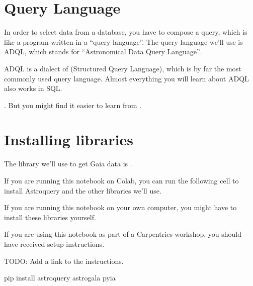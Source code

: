 \documentclass[letterpaper,10pt,english]{sphinxmanual}
\begin{document}
\section{Query Language}
\label{\detokenize{01_query:query-language}}
In order to select data from a database, you have to compose a query, which is like a program written in a “query language”.
The query language we’ll use is ADQL, which stands for “Astronomical Data Query Language”.

ADQL is a dialect of  (Structured Query Language), which is by far the most commonly used query language.  Almost everything you will learn about ADQL also works in SQL.

.
But you might find it easier to learn from .


\section{Installing libraries}
\label{\detokenize{01_query:installing-libraries}}
The library we’ll use to get Gaia data is .

If you are running this notebook on Colab, you can run the following cell to install Astroquery and the other libraries we’ll use.

If you are running this notebook on your own computer, you might have to install these libraries yourself.

If you are using this notebook as part of a Carpentries workshop, you should have received setup instructions.

TODO: Add a link to the instructions.

\begin{sphinxVerbatim}[commandchars=\\\{\}]

 
    

 
    pip install astroquery astro\PYGZhy{}gala pyia
\end{sphinxVerbatim}
\end{document}
